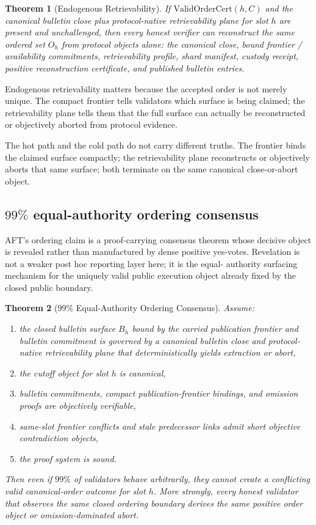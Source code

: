 \documentclass[11pt]{article}
\newtheorem{theorem}{Theorem}
\newcommand{\AFT}{\textsc{AFT}}
\begin{document}
\begin{theorem}[Endogenous Retrievability]
If \(\mathrm{ValidOrderCert}(h, C)\) and the canonical bulletin close plus
protocol-native retrievability plane for slot \(h\) are present and
unchallenged, then every honest verifier can reconstruct the same ordered set
\(O_h\) from protocol objects alone: the canonical close, bound frontier /
availability commitments, retrievability profile, shard manifest, custody
receipt, positive reconstruction certificate, and published bulletin entries.
\end{theorem}

Endogenous retrievability matters because the accepted order is not merely
unique. The compact frontier tells validators which surface is being claimed;
the retrievability plane tells them that the full surface can actually be
reconstructed or objectively aborted from protocol evidence.

The hot path and the cold path do not carry different truths. The frontier
binds the claimed surface compactly; the retrievability plane reconstructs or
objectively aborts that same surface; both terminate on the same canonical
close-or-abort object.

\subsection{\texorpdfstring{\(99\%\)}{99\%} equal-authority ordering consensus}

\AFT{}'s ordering claim is a proof-carrying consensus theorem whose decisive
object is revealed rather than manufactured by dense positive yes-votes.
Revelation is not a weaker post hoc reporting layer here; it is the equal-
authority surfacing mechanism for the uniquely valid public execution object
already fixed by the closed public boundary.

\begin{theorem}[99\% Equal-Authority Ordering Consensus]
Assume:
\begin{enumerate}[leftmargin=1.5em]
\item the closed bulletin surface \(B_h\) bound by the carried publication
frontier and bulletin commitment is governed by a canonical bulletin close and
protocol-native retrievability plane that deterministically yields extraction
or abort,
\item the cutoff object for slot \(h\) is canonical,
\item bulletin commitments, compact publication-frontier bindings, and omission
proofs are objectively verifiable,
\item same-slot frontier conflicts and stale predecessor links admit short
objective contradiction objects,
\item the proof system is sound.
\end{enumerate}
Then even if \(99\%\) of validators behave arbitrarily, they cannot create a
conflicting valid canonical-order outcome for slot \(h\). More strongly,
every honest validator that observes the same closed ordering boundary derives
the same positive order object or omission-dominated abort.
\end{theorem}
\end{document}

